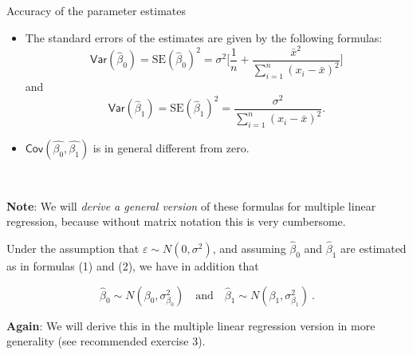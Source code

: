 \documentclass[
  10pt,
  ignorenonframetext,
]{beamer}
\begin{document}
\begin{frame}
\begin{block}{Accuracy of the parameter estimates}
\protect\hypertarget{accuracy-of-the-parameter-estimates}{}
\vspace{2mm}

\begin{itemize}
\item
  The standard errors of the estimates are given by the following
  formulas:
  \[\mathsf{Var}(\hat{\beta}_0)=\text{SE}(\hat{\beta}_0)^2 = \sigma^2 \Big [ \frac{1}{n} + \frac{\bar{x}^2}{\sum_{i=1}^n (x_i -\bar{x})^2} \Big]\]
  and
  \[\mathsf{Var}(\hat{\beta}_1)=\text{SE}(\hat{\beta}_1)^2 = \frac{\sigma^2}{\sum_{i=1}^n (x_i-\bar{x})^2}.\]
\item
  \(\mathsf{Cov}(\hat{\beta_0},\hat{\beta_1})\) is in general different
  from zero.
\end{itemize}

\(~\) \(~\)

\textbf{Note}: We will \emph{derive a general version} of these formulas
for multiple linear regression, because without matrix notation this is
very cumbersome.
\end{block}
\end{frame}

\begin{frame}
Under the assumption that \(\varepsilon \sim N(0,\sigma^2)\), and
assuming \(\hat\beta_0\) and \(\hat\beta_1\) are estimated as in
formulas (1) and (2), we have in addition that

\[
 \hat\beta_0 \sim N(\beta_0,{\sigma^{2}_{\beta_0}}) \quad \text{and} \quad \hat\beta_1 \sim N(\beta_1,{\sigma^{2}_{\beta_1}}) \ .
\]

\vspace{6mm}

\textbf{Again}: We will derive this in the multiple linear regression
version in more generality (see recommended exercise 3).
\end{frame}
\end{document}
